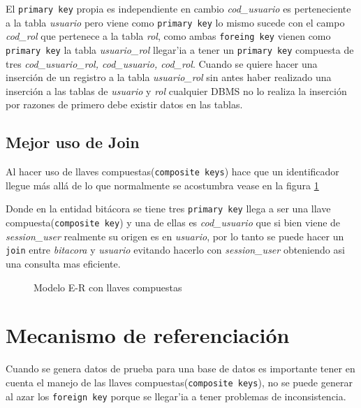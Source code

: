 El \texttt{primary key} propia es independiente en cambio \textit{cod\_usuario} es perteneciente a la tabla \textit{usuario} pero viene como \texttt{primary key} lo mismo sucede con el campo \textit{cod\_rol}  que pertenece a la tabla \textit{rol}, como ambas \texttt{foreing key} vienen como \texttt{primary key} la tabla \textit{usuario\_rol} llegar'ia a tener un \texttt{primary key} compuesta de tres \textit{cod\_usuario\_rol, cod\_usuario, cod\_rol}. Cuando se quiere hacer una inserci\'on de un registro a la tabla \textit{usuario\_rol} sin antes haber realizado una inserci\'on a las tablas de \textit{usuario} y \textit{rol} cualquier DBMS no lo realiza la inserci\'on por razones de primero debe existir datos en las tablas.
\subsection{Mejor uso de Join}
Al hacer uso de llaves compuestas(\texttt{composite keys}) hace que un identificador llegue m\'as all\'a de lo que normalmente se acostumbra vease en la figura  \ref{fig:llavesCompuestas}

Donde en la entidad bit\'acora se tiene tres \texttt{primary key} llega a ser una llave compuesta(\texttt{composite key}) y una de ellas es \textit{cod\_usuario} que si bien viene de \textit{session\_user} realmente su origen es en \textit{usuario}, por lo tanto se puede hacer un \texttt{join} entre \textit{bitacora} y \textit{usuario} evitando hacerlo con \textit{session\_user} obteniendo asi una consulta mas eficiente.
\begin{figure}[H]
\centering
{}
\caption{Modelo E-R con llaves compuestas} \label{fig:llavesCompuestas}
\end{figure}
\section{Mecanismo de referenciaci\'on}
Cuando se genera datos de prueba para una base de datos es importante tener en cuenta el manejo de las llaves compuestas(\texttt{composite keys}), no se puede generar al azar los \texttt{foreign key} porque se llegar'ia a tener problemas de inconsistencia.

